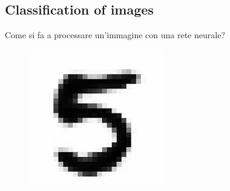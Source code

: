 \subsection{Classification of images}

Come si fa a processare un'immagine con una rete neurale?\\

\begin{figure}[ht]
	\centering
	\includegraphics[width=0.25\linewidth]{figure_ml/classif.png}
\end{figure}
\FloatBarrier

